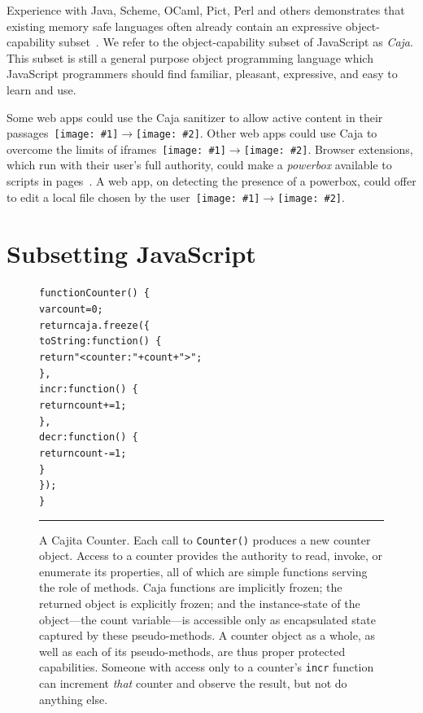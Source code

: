 \documentclass[letterpaper,twocolumn,10pt]{article}
\newcommand{\qq}[2]{{\texttt{[image: \#1]}}$\rightarrow${\texttt{[image: \#2]}}}
\newcommand{\code}[1]{{\tt {#1}}}              %
\begin{document}
Experience with Java, Scheme, OCaml, Pict, Perl and others demonstrates that 
existing memory safe languages often already contain an expressive 
object-capability subset~\cite[respectively]{joe-e, rees96security, emily, 
backwater, caperl}. We refer to the object-capability subset of JavaScript as 
\emph{Caja}. This subset is still a general purpose object programming 
language which JavaScript programmers should find familiar, pleasant, 
expressive, and easy to learn and use. 

Some web apps could use the Caja sanitizer to allow active content in their 
passages~\qq{1}{5}. Other web apps could use Caja to overcome the limits of 
iframes~\qq{3}{5}. Browser extensions, which run with their user's full 
authority, could make a \emph{powerbox} available to scripts in 
pages~\cite{darpareview, stiegler:polaris, seaborn:plash, bitfrost}. A web 
app, on detecting the presence of a powerbox, could offer to edit a local 
file chosen by the user~\qq{4}{6}.

\section{Subsetting JavaScript}
\label{sec:subset}

\begin{figure}[t!]
\begin{alltt}
function Counter()\ \{
  var count = 0;
  return caja.freeze(\{
    toString: function()\ \{ 
      return "<counter: " + count + ">"; 
    \},
    incr: function()\ \{ 
      return count += 1; 
    \},
    decr: function()\ \{ 
      return count -= 1; 
    \}
  \});
\}
\end{alltt}

\caption[A Cajita Counter.]{A Cajita Counter. Each call to \code{Counter()} 
produces a new counter object. Access to a counter provides the authority to 
read, invoke, or enumerate its properties, all of which are simple functions 
serving the role of methods. Caja functions are implicitly frozen; the 
returned object is explicitly frozen; and the instance-state of the 
object---the count variable---is accessible only as encapsulated state 
captured by these pseudo-methods. A counter object as a whole, as well as 
each of its pseudo-methods, are thus proper protected capabilities. Someone 
with access only to a counter's \code{incr} function can increment 
\emph{that} counter and observe the result, but not do anything else.
 \\ } \hrule
\label{fig:cajita-counter}
\end{figure}
\end{document}
